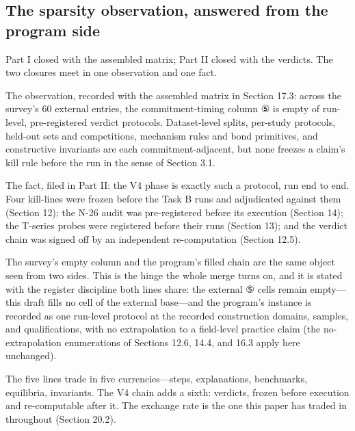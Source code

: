 \documentclass[11pt]{article}
\begin{document}
\subsection{The sparsity observation, answered from the program side}
\noindent Part I closed with the assembled matrix; Part II closed with the verdicts. The two closures meet in one observation and one fact.\par
\noindent The observation, recorded with the assembled matrix in Section 17.3: across the survey's 60 external entries, the commitment-timing column ⑤ is empty of run-level, pre-registered verdict protocols. Dataset-level splits, per-study protocols, held-out sets and competitions, mechanism rules and bond primitives, and constructive invariants are each commitment-adjacent, but none freezes a claim's kill rule before the run in the sense of Section 3.1.\par
\noindent The fact, filed in Part II: the V4 phase is exactly such a protocol, run end to end. Four kill-lines were frozen before the Task B runs and adjudicated against them (Section 12); the N-26 audit was pre-registered before its execution (Section 14); the T-series probes were registered before their runs (Section 13); and the verdict chain was signed off by an independent re-computation (Section 12.5).\par
\noindent The survey's empty column and the program's filled chain are the same object seen from two sides. This is the hinge the whole merge turns on, and it is stated with the register discipline both lines share: the external ⑤ cells remain empty—this draft fills no cell of the external base—and the program's instance is recorded as one run-level protocol at the recorded construction domains, samples, and qualifications, with no extrapolation to a field-level practice claim (the no-extrapolation enumerations of Sections 12.6, 14.4, and 16.3 apply here unchanged).\par
\noindent The five lines trade in five currencies—steps, explanations, benchmarks, equilibria, invariants. The V4 chain adds a sixth: verdicts, frozen before execution and re-computable after it. The exchange rate is the one this paper has traded in throughout (Section 20.2).\par
\end{document}

